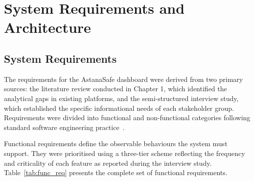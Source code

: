 \documentclass[12pt,a4paper]{report}
\begin{document}
\section{System Requirements and Architecture}

\subsection{System Requirements}

The requirements for the AstanaSafe dashboard were derived from two primary sources: the literature review conducted in Chapter 1, which identified the analytical gaps in existing platforms, and the semi-structured interview study, which established the specific informational needs of each stakeholder group. Requirements were divided into functional and non-functional categories following standard software engineering practice~\cite{swebok2014}.

Functional requirements define the observable behaviours the system must support. They were prioritised using a three-tier scheme reflecting the frequency and criticality of each feature as reported during the interview study. Table~\ref{tab:func_req} presents the complete set of functional requirements.

\renewcommand{\arraystretch}{1.4}
\end{document}
